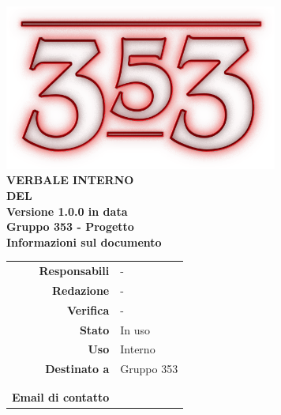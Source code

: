 \documentclass[openany, a4paper, 12pt]{report}
\begin{document}
\begin{titlepage}
	\centering
	\vfill
	{
		\bfseries
		\vskip2cm
		\includegraphics[width=9cm]{../../common/images/logo.png} \\
		\vfill
		\Huge{VERBALE INTERNO\\DEL {}}\\
		\vfill
		\Large Versione 1.0.0 in data \\
		\large Gruppo 353 - Progetto \progetto \\
		\vfill
		\normalsize Informazioni sul documento\\
		\begin{table}[htbp]
			\centering
			\renewcommand\arraystretch{1.2}
			\begin{tabular}{r|l}
				\hline
				\textbf{Responsabili}	& -\\
				
				\textbf{Redazione} 		& - \\
				\textbf{Verifica} 		& - \\	
				
				\textbf{Stato} 			& In uso\\
				\textbf{Uso}			& Interno\\
				\textbf{Destinato a}   	& Gruppo 353\\
										& \Vardanega\\
										& \Cardin\\
				
				\textbf{Email di contatto}	& \mailgroup
			\end{tabular}
		\end{table}
		\vfill 
	}    
\end{titlepage}
\newpage
{}

 
\end{document}

